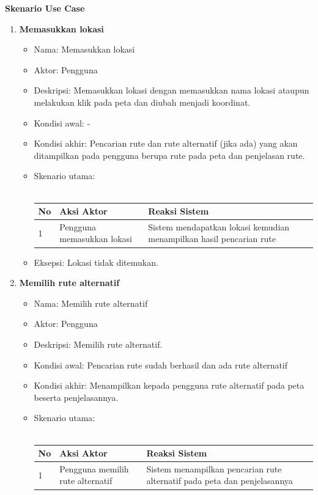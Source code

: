 \documentclass[a4paper,twoside]{article}
\begin{document}
\textbf{Skenario Use Case}
\begin{enumerate}
	\item \textbf{Memasukkan lokasi}
	\begin{itemize}
			\item Nama: Memasukkan lokasi
			\item Aktor: Pengguna
			\item Deskripsi: Memasukkan lokasi dengan memasukkan nama lokasi ataupun melakukan klik pada peta dan diubah menjadi koordinat.
			\item Kondisi awal: -
			\item Kondisi akhir: Pencarian rute dan rute alternatif (jika ada) yang akan ditampilkan pada pengguna berupa rute pada peta dan penjelasan rute.
			\item Skenario utama: \\ \\
				\begin{tabular}{|p{0.5cm} |p{6cm}| p{6cm}|}
						\hline
							No 	& Aksi Aktor & Reaksi Sistem \\ \hline
							1 	& Pengguna memasukkan lokasi 	&	Sistem mendapatkan lokasi kemudian menampilkan hasil pencarian rute \\ \hline 
						\end{tabular} 
			\item Eksepsi: Lokasi tidak ditemukan.
		\end{itemize}
	\item \textbf{Memilih rute alternatif}
	\begin{itemize}
			\item Nama: Memilih rute alternatif
			\item Aktor: Pengguna
			\item Deskripsi: Memilih rute alternatif.
			\item Kondisi awal: Pencarian rute sudah berhasil dan ada rute alternatif
			\item Kondisi akhir: Menampilkan kepada pengguna rute alternatif pada peta beserta penjelasannya.
			\item Skenario utama: \\ \\
				\begin{tabular}{|p{0.5cm} |p{6cm}| p{6cm}|}
						\hline
							No 	& Aksi Aktor & Reaksi Sistem \\ \hline
							1 	& Pengguna memilih rute alternatif 	&	Sistem menampilkan pencarian rute alternatif pada peta dan penjelasannya \\ \hline 

\end{tabular}
\end{itemize}
\end{enumerate}
\end{document}
